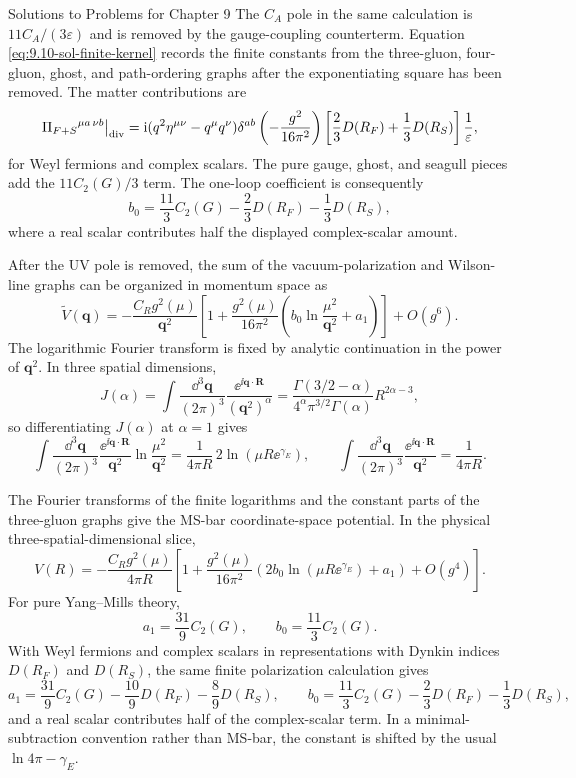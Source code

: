 \begin{bankssolutions}{Solutions to Problems for Chapter 9}
The $C_A$ pole in the same calculation is $11C_A/(3\varepsilon)$ and is
removed by the gauge-coupling counterterm.  Equation
\eqref{eq:9.10-sol-finite-kernel} records the finite constants from the
three-gluon, four-gluon, ghost, and path-ordering graphs after the
exponentiating square has been removed.
The matter contributions are
\[
 \Pi_{F+S}{}^{\mu a\,\nu b}\big|_{\rm div}
 =\mathrm{i}(q^2\eta^{\mu\nu}-q^\mu q^\nu)\delta^{ab}
 \left(-\frac{g^2}{16\pi^2}\right)
 \left[\frac23D(R_F)+\frac13D(R_S)\right]\frac1\varepsilon,
\]
for Weyl fermions and complex scalars.  The pure gauge, ghost, and seagull
pieces add the $11C_2(G)/3$ term.  The one-loop coefficient is consequently
\[
 b_0=\frac{11}{3}C_2(G)-\frac{2}{3}D(R_F)-\frac{1}{3}D(R_S),
\]
where a real scalar contributes half the displayed complex-scalar amount.

After the UV pole is removed, the sum of the vacuum-polarization and
Wilson-line graphs can be organized in momentum space as
\[
 \widetilde V(\mathbf q)=-\frac{C_Rg^2(\mu)}{\mathbf q^2}
 \left[1+\frac{g^2(\mu)}{16\pi^2}
 \left(b_0\ln\frac{\mu^2}{\mathbf q^2}+a_1\right)\right]
 +O(g^6).
\]
The logarithmic Fourier transform is fixed by analytic continuation in the
power of $\mathbf q^2$.  In three spatial dimensions,
\[
 J(\alpha)=\int\frac{\dd^3\mathbf q}{(2\pi)^3}
 \frac{\ee^{\ii\mathbf q\cdot\mathbf R}}{(\mathbf q^2)^\alpha}
 =\frac{\Gamma(3/2-\alpha)}{4^\alpha\pi^{3/2}\Gamma(\alpha)}
 R^{2\alpha-3},
\]
so differentiating $J(\alpha)$ at $\alpha=1$ gives
\[
 \int\frac{\dd^3\mathbf q}{(2\pi)^3}\frac{\ee^{\ii\mathbf q\cdot\mathbf R}}
 {\mathbf q^2}\ln\frac{\mu^2}{\mathbf q^2}
 =\frac{1}{4\pi R}\,2\ln(\mu R\ee^{\gamma_E}),
 \qquad
 \int\frac{\dd^3\mathbf q}{(2\pi)^3}\frac{\ee^{\ii\mathbf q\cdot\mathbf R}}
 {\mathbf q^2}=\frac{1}{4\pi R}.
\]

The Fourier transforms of the finite logarithms and the constant parts of the
three-gluon graphs give the MS-bar coordinate-space potential.  In the physical
three-spatial-dimensional slice,
\begin{equation}
 V(R)=-\frac{C_Rg^2(\mu)}{4\pi R}
 \left[1+\frac{g^2(\mu)}{16\pi^2}
 \left(2b_0\ln(\mu R\ee^{\gamma_E})+a_1\right)
 +O(g^4)\right].
 \label{eq:9.10-sol-potential}
\end{equation}
For pure Yang--Mills theory,
\[
 a_1=\frac{31}{9}C_2(G),
 \qquad b_0=\frac{11}{3}C_2(G).
\]
With Weyl fermions and complex scalars in representations with Dynkin indices
$D(R_F)$ and $D(R_S)$, the same finite polarization calculation gives
\[
 a_1=\frac{31}{9}C_2(G)-\frac{10}{9}D(R_F)-\frac89D(R_S),
 \qquad
 b_0=\frac{11}{3}C_2(G)-\frac23D(R_F)-\frac13D(R_S),
\]
and a real scalar contributes half of the complex-scalar term.  In a
minimal-subtraction convention rather than MS-bar, the constant is shifted by
the usual $\ln4\pi-\gamma_E$.


\end{bankssolutions}

